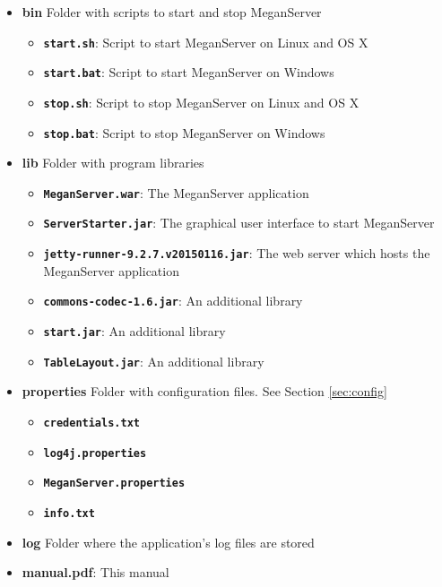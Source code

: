 \documentclass[11pt]{article}
\begin{document}
\begin{itemize}

\item \textbf{bin} Folder with scripts to start and stop MeganServer
	\begin{itemize}
		\item \textbf{\texttt{start.sh}}: Script to start MeganServer on Linux and OS X
		\item \textbf{\texttt{start.bat}}: Script to start MeganServer on Windows
		\item \textbf{\texttt{stop.sh}}: Script to stop MeganServer on Linux and OS X
		\item \textbf{\texttt{stop.bat}}: Script to stop MeganServer on Windows
	\end{itemize}
\item \textbf{lib} Folder with program libraries
	\begin{itemize}
		\item \textbf{\texttt{MeganServer.war}}: The MeganServer application
		\item \textbf{\texttt{ServerStarter.jar}}: The graphical user interface to start MeganServer
		\item \textbf{\texttt{jetty-runner-9.2.7.v20150116.jar}}: The web server which hosts the MeganServer application
		\item \textbf{\texttt{commons-codec-1.6.jar}}: An additional library
		\item \textbf{\texttt{start.jar}}: An additional library
		\item \textbf{\texttt{TableLayout.jar}}: An additional library
	\end{itemize}
\item \textbf{properties} Folder with configuration files. See Section \ref{sec:config}
	\begin{itemize}
	\item \textbf{\texttt{credentials.txt}}
	\item \textbf{\texttt{log4j.properties}}
	\item \textbf{\texttt{MeganServer.properties}}
	\item \textbf{\texttt{info.txt}}
	\end{itemize}
\item \textbf{log} Folder where the application's log files are stored
\item \textbf{manual.pdf}: This manual
\end{itemize}
\end{document}
